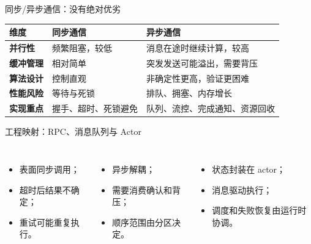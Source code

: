 \documentclass[UTF8,fontset=none,aspectratio=169,10pt]{beamer}
\begin{document}
\begin{frame}{同步/异步通信：没有绝对优劣}
\scriptsize
\begin{tabularx}{\linewidth}{>{\bfseries}p{2.2cm}X X}
\toprule
维度 & 同步通信 & 异步通信 \\
\midrule
并行性 & 频繁阻塞，较低 & 消息在途时继续计算，较高 \\
缓冲管理 & 相对简单 & 突发发送可能溢出，需要背压 \\
算法设计 & 控制直观 & 非确定性更高，验证更困难 \\
性能风险 & 等待与死锁 & 排队、拥塞、内存增长 \\
实现重点 & 握手、超时、死锁避免 & 队列、流控、完成通知、资源回收 \\
\bottomrule
\end{tabularx}
\vfill
{}
\end{frame}

\begin{frame}{工程映射：RPC、消息队列与 Actor}
\begin{columns}[T,onlytextwidth]
\begin{itemize}\item 表面同步调用；\item 超时后结果不确定；\item 重试可能重复执行。\end{itemize}
\begin{itemize}\item 异步解耦；\item 需要消费确认和背压；\item 顺序范围由分区决定。\end{itemize}
\begin{itemize}\item 状态封装在 actor；\item 消息驱动执行；\item 调度和失败恢复由运行时协调。\end{itemize}
\end{columns}
\vfill
{}
\end{frame}

\end{document}
